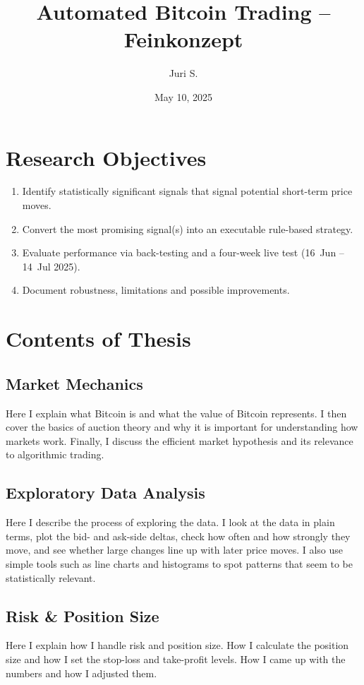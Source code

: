 \documentclass[12pt,a4paper]{article}
\title{Automated Bitcoin Trading – Feinkonzept}
\author{Juri S.}
\date{May 10, 2025}
\begin{document}
\maketitle
\tableofcontents
\newpage

\section{Research Objectives}
\begin{enumerate}
  \item Identify statistically significant signals that signal potential short-term price moves.
  \item Convert the most promising signal(s) into an executable rule-based strategy.
  \item Evaluate performance via back-testing and a four-week live test (16~Jun – 14~Jul 2025).
  \item Document robustness, limitations and possible improvements.
\end{enumerate}

\section{Contents of Thesis}
\subsection{Market Mechanics}
Here I explain what Bitcoin is and what the value of Bitcoin represents. I then
cover the basics of auction theory and why it is important for understanding
how markets work. Finally, I discuss the efficient market hypothesis and its
relevance to algorithmic trading.

\subsection{Exploratory Data Analysis}
Here I describe the process of exploring the data. I look at the data in plain
terms, plot the bid- and ask-side deltas, check how often and how strongly
they move, and see whether large changes line up with later price moves. I
also use simple tools such as line charts and histograms to spot patterns that
seem to be statistically relevant.

\subsection{Risk \& Position Size}
Here I explain how I handle risk and position size. How I calculate the
position size and how I set the stop-loss and take-profit levels. How I came
up with the numbers and how I adjusted them.
\end{document}
